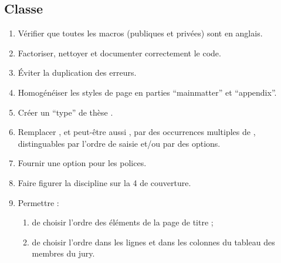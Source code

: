 \subsection{Classe}
\label{sec:classe-ult}

\begin{enumerate}
\item Vérifier que toutes les macros (publiques et privées) sont en anglais.
\item Factoriser, nettoyer et documenter correctement le code.
\item Éviter la duplication des erreurs.
\item Homogénéiser les styles de page en parties \enquote{mainmatter} et
  \enquote{appendix}.
\item Créer un \enquote{type} de thèse .
\item Remplacer , et peut-être aussi , par des
  occurrences multiples de , distinguables par l'ordre de saisie
  et/ou par des  options.
\item Fournir une option pour les polices.
\item Faire figurer la discipline sur la 4\ieme{} de couverture.
\item Permettre :
  \begin{enumerate}
  \item de choisir l'ordre des éléments de la page de titre ;
  \item de choisir l'ordre dans les lignes et dans les colonnes du
    tableau des membres du jury.
  \end{enumerate}

\end{enumerate}
